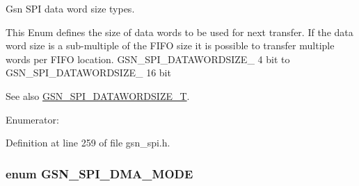 Gsn SPI data word size types. 

This Enum defines the size of data words to be used for next transfer. If the data word size is a sub-\/multiple of the FIFO size it is possible to transfer multiple words per FIFO location. GSN\_\-SPI\_\-DATAWORDSIZE\_ 4 bit to GSN\_\-SPI\_\-DATAWORDSIZE\_ 16 bit

\begin{DoxySeeAlso}{See also}
\hyperlink{a00655_ga63cbe81427185213bde26b93dde72747}{GSN\_\-SPI\_\-DATAWORDSIZE\_\-T}. 
\end{DoxySeeAlso}
\begin{Desc}
\item[Enumerator: ]\par
\begin{description}
\item[{\em 
\hypertarget{a00655_gga52e3e63232981dd9e13226ef140541bfa1e0f6a3003be36a5ace865cee8d34085}{
GSN\_\-SPI\_\-DATAWORDSIZE\_\-8}
\label{a00655_gga52e3e63232981dd9e13226ef140541bfa1e0f6a3003be36a5ace865cee8d34085}
}]\item[{\em 
\hypertarget{a00655_gga52e3e63232981dd9e13226ef140541bfa22e72ad895b04d78a53fa2ffba6baa57}{
GSN\_\-SPI\_\-DATAWORDSIZE\_\-16}
\label{a00655_gga52e3e63232981dd9e13226ef140541bfa22e72ad895b04d78a53fa2ffba6baa57}
}]\end{description}
\end{Desc}



Definition at line 259 of file gsn\_\-spi.h.

\hypertarget{a00655_ga5877a1a4dee99757a5560a974edd42ca}{
\subsubsection[{GSN\_\-SPI\_\-DMA\_\-MODE}]{\setlength{\rightskip}{0pt plus 5cm}enum {\bf GSN\_\-SPI\_\-DMA\_\-MODE}}}
\label{a00655_ga5877a1a4dee99757a5560a974edd42ca}


